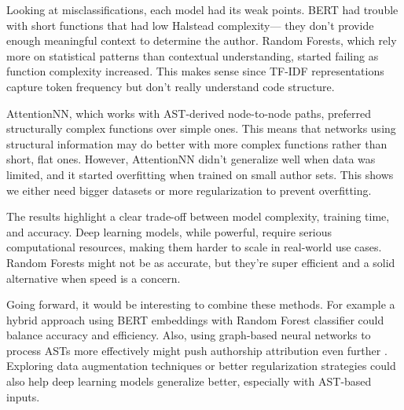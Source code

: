 \documentclass[conference]{IEEEtran}
\begin{document}
Looking at misclassifications, each model had its weak points. BERT had trouble with short functions that had low Halstead complexity— they 
don’t provide enough meaningful context to determine the author. Random Forests, which rely more on statistical patterns than contextual 
understanding, started failing as function complexity increased. This makes sense since TF-IDF representations capture token frequency but 
don’t really understand code structure.



AttentionNN, which works with AST-derived node-to-node paths, preferred structurally complex functions over simple ones. This means that 
networks using structural information may do better with more complex functions rather than short, flat ones. However, AttentionNN didn’t 
generalize well when data was limited, and it started overfitting when trained on small author sets. This shows we either need bigger 
datasets or more regularization to prevent overfitting.

The results highlight a clear trade-off between model complexity, training time, and accuracy. Deep learning models, while powerful, 
require serious computational resources, making them harder to scale in real-world use cases. Random Forests might not be as accurate, 
but they’re super efficient and a solid alternative when speed is a concern.

Going forward, it would be interesting to combine these methods. For example a hybrid approach using BERT embeddings with Random Forest 
classifier could balance accuracy and efficiency. Also, using graph-based neural networks to process ASTs more effectively might push 
authorship attribution even further \cite{dependence_graphs}. Exploring data augmentation techniques or better regularization strategies could also help deep 
learning models generalize better, especially with AST-based inputs.
\end{document}
